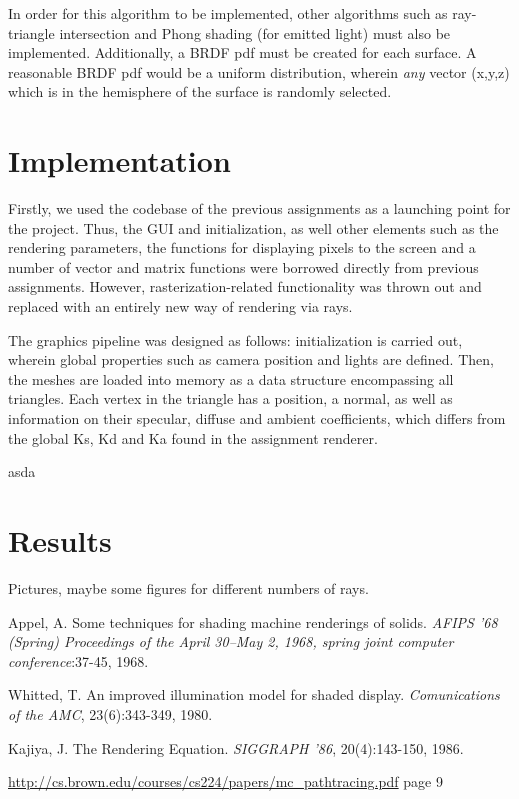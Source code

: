 \documentclass[journal]{IEEEtran}
\begin{document}
In order for this algorithm to be implemented, other algorithms such as ray-triangle intersection and Phong shading (for emitted light) must also be implemented. 
Additionally, a BRDF pdf must be created for each surface. A reasonable BRDF pdf would be a uniform distribution, wherein \emph{any} 
vector (x,y,z) which is in the hemisphere of the surface is randomly selected.

\section{Implementation}
Firstly, we used the codebase of the previous assignments as a launching point for the project. Thus, the GUI and initialization, as well other elements such as the rendering parameters, the functions for displaying pixels to the screen and a number of vector and matrix functions were borrowed directly from previous assignments. However, rasterization-related functionality was thrown out and replaced with an entirely new way of rendering via rays.
\par
The graphics pipeline was designed as follows: initialization is carried out, wherein global properties such as camera position and lights are defined. Then, the meshes are loaded into memory as a data structure encompassing all triangles. Each vertex in the triangle has a position, a normal, as well as information on their specular, diffuse and ambient coefficients, which differs from the global Ks, Kd and Ka found in the assignment renderer.

\par
asda

\section{Results}
Pictures, maybe some figures for different numbers of rays.



\begin{thebibliography}{4}

Appel, A. Some techniques for shading machine renderings of solids. \emph{AFIPS '68 (Spring) Proceedings of the April 30--May 2, 1968, spring joint computer conference}:37-45, 1968.

Whitted, T. An improved illumination model for shaded display. \emph{Comunications of the AMC}, 23(6):343-349, 1980.

Kajiya, J. The Rendering Equation. \emph{SIGGRAPH '86}, 20(4):143-150, 1986.

\url{http://cs.brown.edu/courses/cs224/papers/mc_pathtracing.pdf} page 9

\end{thebibliography}

\end{document}
